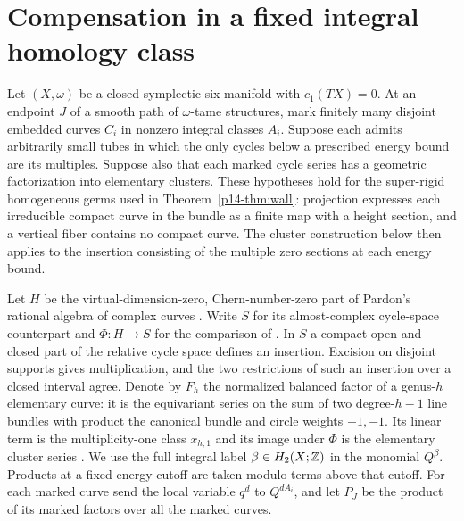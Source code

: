 \section{Compensation in a fixed integral homology class}\label{p14-sec:compact}
Let \((X,\omega)\) be a closed symplectic six-manifold with
\(c_1(TX)=0\). At an endpoint \(J\) of a smooth path of
\(\omega\)-tame structures, mark finitely many disjoint embedded
curves \(C_i\) in nonzero integral classes \(A_i\). Suppose each admits
arbitrarily small tubes in which the only cycles below a prescribed energy
bound are its multiples. Suppose also that each marked cycle series
has a geometric factorization into elementary clusters. These
hypotheses hold for the super-rigid homogeneous germs used in
Theorem~\ref{p14-thm:wall}: projection expresses each irreducible compact
curve in the bundle as a finite map with a height section, and a
vertical fiber contains no compact curve. The cluster construction
below then applies to the insertion consisting of the multiple zero
sections at each energy bound.

Let \(H\) be the virtual-dimension-zero, Chern-number-zero part of
Pardon's rational algebra of complex curves \cite{pardon}.
Write \(S\) for its almost-complex cycle-space counterpart and
\(\Phi:H\to S\) for the comparison of \cite[\S2]{WueProduct}. In \(S\)
a compact open and closed part of the relative cycle space defines an
insertion. Excision on disjoint supports gives multiplication, and
the two restrictions of such an insertion over a closed interval
agree. Denote by \(F_h\) the normalized balanced factor of a genus-\(h\)
elementary curve: it is the equivariant series on the sum of two
degree-\(h-1\) line bundles with product the canonical bundle and
circle weights \(+1,-1\). Its linear term is the multiplicity-one
class \(x_{h,1}\) and its image under \(\Phi\) is the elementary
cluster series \cite[\S\S3--4]{WueProduct}. We use the full integral
label \(\beta\in H_2(X;\mathbb Z)\) in the monomial \(Q^\beta\).
Products at a fixed energy cutoff are taken modulo terms above that
cutoff. For each marked curve send the local variable \(q^d\) to
\(Q^{dA_i}\), and let \(P_J\) be the product of its marked factors
over all the marked curves.

